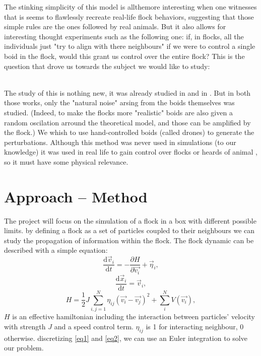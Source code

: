 \documentclass{article}
\begin{document}
The stinking simplicity of this model is allthemore interesting when one witnesses that is seems to flawlessly recreate real-life flock behaviors, suggesting that those simple rules are the ones followed by real animals. But it also allows for interesting thought experiments such as the following one: if, in flocks, all the individuals just "try to align with there neighbours" if we were to control a single boid in the flock, would this grant us control over the entire flock? This is the question that drove us towards the subject we would like to study:
\begin{center}
\end{center}\\

The study of this is nothing new, it was already studied in  \cite{Cav} and in \cite{Yuh}. But in both those works, only the "natural noise" arsing from the boids themselves was studied. (Indeed, to make the flocks more "realistic" boids are also given a random oscilation arround the theoretical model, and those can be amplified by the flock.) We whish to use hand-controlled boids (called drones) to generate the perturbations. Although this method was never used in simulations (to our knowledge) it was used in real life to gain control over flocks or heards of animal \cite{Ros}, so it must have some physical relevance. \\
 \newpage

\section*{Approach – Method}
 The project will focus on the simulation of a flock in a box with different possible limits.
 by defining a flock as a set of particles coupled to their neighbours we can study the propagation of information within the flock. The flock dynamic can be described with a simple equation:
 \begin{equation}
     \frac{\mathrm{d}\vec{v}_i}{\mathrm{d}t}=-\frac{\partial H}{\partial \vec{v_i}} + \vec{\eta}_i,
     \label{eq1}
 \end{equation}
 \begin{equation}
     \frac{\mathrm{d}\vec{x}_i}{\mathrm{d}t}=\vec{v}_i,
     \label{eq2}
 \end{equation}
  \begin{equation}
     H=\frac{1}{2} J\sum_{i,j=1}^N \eta_{ij}(\vec{v_i}-\vec{v_j})^{2}  +  \sum_{i}^N V(\vec{v_i}),
     \label{eq3}
 \end{equation}
 $H$ is an effective hamiltonian including the interaction between particles' velocity with strength $J$ and a speed control term. $\eta_{ij}$ is 1 for interacting neighbour, 0 otherwise.
 discretizing \ref{eq1} and \ref{eq2}, we can use an Euler integration to solve our problem.
 
\end{document}

